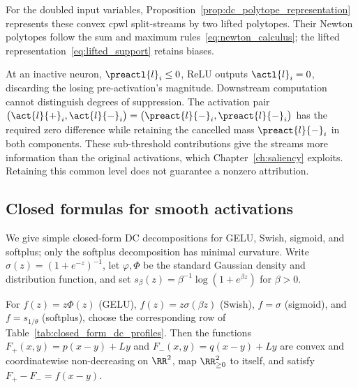 For the doubled input variables, Proposition~\ref{prop:dc_polytope_representation} represents these convex \ac{cpwl} split-streams by two lifted polytopes. Their Newton polytopes follow the sum and maximum rules~\eqref{eq:newton_calculus}; the lifted representation~\eqref{eq:lifted_support} retains biases.

\begin{remark}\label{rem:subthreshold}
At an inactive neuron, $\preactl{l}_i\le0$, ReLU outputs $\actl{l}_i=0$, discarding the losing pre-activation's magnitude. Downstream computation cannot distinguish degrees of suppression. The activation pair $\bigl(\act{l}{+}_i,\act{l}{-}_i\bigr)=\bigl(\preact{l}{-}_i,\preact{l}{-}_i\bigr)$ has the required zero difference while retaining the cancelled mass $\preact{l}{-}_i$ in both components. These sub-threshold contributions give the streams more information than the original activations, which Chapter~\ref{ch:saliency} exploits. Retaining this common level does not guarantee a nonzero attribution.
\end{remark}

\subsection{Closed formulas for smooth activations}\label{sec:closed_form_dc_activations}

We give simple closed-form DC decompositions for GELU, Swish, sigmoid, and softplus; only the softplus decomposition has minimal curvature. Write $\sigma(z)=(1+e^{-z})^{-1}$, let $\varphi,\Phi$ be the standard Gaussian density and distribution function, and set $s_\beta(z)=\beta^{-1}\log(1+e^{\beta z})$ for $\beta>0$.

\begin{corollary}\label{cor:closed_form_dc_activations}
For $f(z)=z\Phi(z)$ (GELU), $f(z)=z\sigma(\beta z)$ (Swish), $f=\sigma$ (sigmoid), and $f=s_{1/\theta}$ (softplus), choose the corresponding row of Table~\ref{tab:closed_form_dc_profiles}. Then the functions $F_+(x,y)=p(x-y)+Ly$ and $F_-(x,y)=q(x-y)+Ly$ are convex and coordinatewise non-decreasing on $\RR^2$, map $\RR^2_{\ge0}$ to itself, and satisfy $F_+-F_-=f(x-y)$.
\end{corollary}

